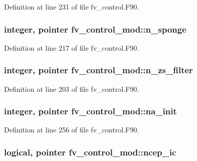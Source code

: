 Definition at line 231 of file fv\-\_\-control.\-F90.

\subsubsection[{n\-\_\-sponge}]{\setlength{\rightskip}{0pt plus 5cm}integer, pointer fv\-\_\-control\-\_\-mod\-::n\-\_\-sponge\hspace{0.3cm}{\ttfamily [private]}}\label{classfv__control__mod_aa49e642e289810bd0ae3e8d564ca9daa}


Definition at line 217 of file fv\-\_\-control.\-F90.

\subsubsection[{n\-\_\-zs\-\_\-filter}]{\setlength{\rightskip}{0pt plus 5cm}integer, pointer fv\-\_\-control\-\_\-mod\-::n\-\_\-zs\-\_\-filter\hspace{0.3cm}{\ttfamily [private]}}\label{classfv__control__mod_a35724aa7d912fc934a1706bee488134b}


Definition at line 203 of file fv\-\_\-control.\-F90.

\subsubsection[{na\-\_\-init}]{\setlength{\rightskip}{0pt plus 5cm}integer, pointer fv\-\_\-control\-\_\-mod\-::na\-\_\-init\hspace{0.3cm}{\ttfamily [private]}}\label{classfv__control__mod_a8fbe8612bdbe6d72e8790ff88dca41a6}


Definition at line 256 of file fv\-\_\-control.\-F90.

\subsubsection[{ncep\-\_\-ic}]{\setlength{\rightskip}{0pt plus 5cm}logical, pointer fv\-\_\-control\-\_\-mod\-::ncep\-\_\-ic\hspace{0.3cm}{\ttfamily [private]}}\label{classfv__control__mod_aff372420df2393f8cf3582a9ed117a1c}


